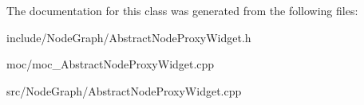 The documentation for this class was generated from the following files\-:\begin{DoxyCompactItemize}
\item 
include/\-Node\-Graph/Abstract\-Node\-Proxy\-Widget.\-h\item 
moc/moc\-\_\-\-Abstract\-Node\-Proxy\-Widget.\-cpp\item 
src/\-Node\-Graph/Abstract\-Node\-Proxy\-Widget.\-cpp\end{DoxyCompactItemize}
